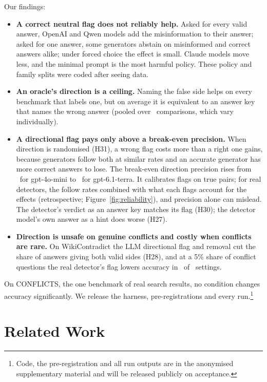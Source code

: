 Our findings:
\begin{itemize}[leftmargin=*,itemsep=1pt,topsep=2pt]
\item \textbf{A correct neutral flag does not reliably help.} Asked for every valid answer, OpenAI and Qwen models add the
misinformation to their answer; asked for one answer, some generators abstain on misinformed and correct answers
alike; under forced choice the effect is small. Claude models move less, and the minimal prompt is the most harmful
policy. These policy and family splits were coded after seeing data.
\item \textbf{An oracle's direction is a ceiling.} Naming the false side helps on every benchmark that labels one, but
on average it is equivalent to an answer key that names the wrong answer (pooled over \PoolTwentyThreeK\
comparisons, which vary individually).
\item \textbf{A directional flag pays only above a break-even precision.} When direction is randomised (H31), a wrong
flag costs more than a right one gains, because generators follow both at similar rates and an accurate generator has
more correct answers to lose. The break-even direction precision rises from \beMin\ for gpt-4o-mini to \beMax\ for
gpt-6.1-terra. It calibrates flags on true pairs; for real detectors, the follow rates combined with what each
flags account for the effects (retrospective; Figure~\ref{fig:reliability}), and precision alone can mislead. The detector's verdict as an answer key matches its flag (H30); the detector model's
own answer as a hint does worse (H27).
\item \textbf{Direction is unsafe on genuine conflicts and costly when conflicts are rare.} On WikiContradict the LLM
directional flag and removal cut the share of answers giving both valid sides (H28), and at a 5\% share of conflict
questions the real detector's flag lowers accuracy in \prevNegFive\ of \prevN\ settings.
\end{itemize}
On CONFLICTS, the one benchmark of real search results, no condition changes accuracy significantly. We release the harness, pre-registrations and every run.\footnote{Code, the pre-registration and
all run outputs are in the anonymised supplementary material and will be released publicly on acceptance.}
\section{Related Work}
\label{sec:related}


